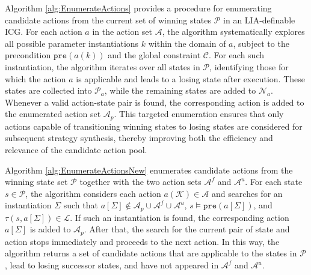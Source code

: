 \documentclass[review]{elsarticle}
\newcommand{\parmset}{\mathcal{K}}
\newcommand{\positiveSet}{\mathcal{P}}
\newcommand{\negativeSet}{\mathcal{N}}
\newcommand{\loseSet}{\mathcal{L}}
\newcommand{\expVec}{\Sigma}
\newcommand{\act}{\mathcal{A}}
\newcommand{\constraint}{\mathcal{C}}
\newcommand{\pre}{\mathtt{pre}}
\newcommand{\suc}{\tau}
\begin{document}
Algorithm \ref{alg:EnumerateActions} provides a procedure for enumerating candidate actions from the current set of winning states $\positiveSet$ in an LIA-definable ICG. 
For each action $a$ in the action set $\act$, the algorithm systematically explores all possible parameter instantiations $k$ within the domain of $a$, subject to the precondition $\pre(a(k))$ and the global constraint $\constraint$. 
For each such instantiation, the algorithm iterates over all states in $\positiveSet$, identifying those for which the action $a$ is applicable and leads to a losing state after execution. 
These states are collected into $\positiveSet_a$, while the remaining states are added to $\negativeSet_a$. 
Whenever a valid action-state pair is found, the corresponding action is added to the enumerated action set $\act_p$. 
This targeted enumeration ensures that only actions capable of transitioning winning states to losing states are considered for subsequent strategy synthesis, 
thereby improving both the efficiency and relevance of the candidate action pool.

{\color{red}
Algorithm \ref{alg:EnumerateActionsNew} enumerates candidate actions from the winning state set $\positiveSet$ together with the two action sets $\act^f$ and $\act^u$.
For each state $s \in \positiveSet$, the algorithm considers each action $a(\parmset) \in \act$ and searches for an instantiation $\expVec$ such that $a[\expVec] \notin \act_p \cup \act^f \cup \act^u$, $s \models \pre(a[\expVec])$, and $\suc(s, a[\expVec]) \in \loseSet$.
If such an instantiation is found, the corresponding action $a[\expVec]$ is added to $\act_p$.
After that, the search for the current pair of state and action stops immediately and proceeds to the next action.
In this way, the algorithm returns a set of candidate actions that are applicable to the states in $\positiveSet$, lead to losing successor states, and have not appeared in $\act^f$ and $\act^u$.
}
\end{document}

